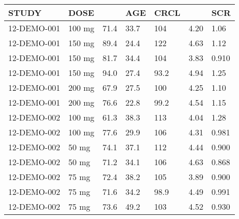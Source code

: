 {\def\arraystretch{1.4}\tabcolsep=5pt
\begin{threeparttable}
\begin{tabular}[h]{lllllll}
\hline
STUDY & DOSE &  & AGE & CRCL &  & SCR \\
\hline
12-DEMO-001 & 100 mg & 71.4 & 33.7 & 104 & 4.20 & 1.06 \\
12-DEMO-001 & 150 mg & 89.4 & 24.4 & 122 & 4.63 & 1.12 \\
12-DEMO-001 & 150 mg & 81.7 & 34.4 & 104 & 3.83 & 0.910 \\
12-DEMO-001 & 150 mg & 94.0 & 27.4 & 93.2 & 4.94 & 1.25 \\
12-DEMO-001 & 200 mg & 67.9 & 27.5 & 100 & 4.25 & 1.10 \\
12-DEMO-001 & 200 mg & 76.6 & 22.8 & 99.2 & 4.54 & 1.15 \\
12-DEMO-002 & 100 mg & 61.3 & 38.3 & 113 & 4.04 & 1.28 \\
12-DEMO-002 & 100 mg & 77.6 & 29.9 & 106 & 4.31 & 0.981 \\
12-DEMO-002 & 50 mg & 74.1 & 37.1 & 112 & 4.44 & 0.900 \\
12-DEMO-002 & 50 mg & 71.2 & 34.1 & 106 & 4.63 & 0.868 \\
12-DEMO-002 & 75 mg & 72.4 & 38.2 & 105 & 3.89 & 0.900 \\
12-DEMO-002 & 75 mg & 71.6 & 34.2 & 98.9 & 4.49 & 0.991 \\
12-DEMO-002 & 75 mg & 73.6 & 49.2 & 103 & 4.52 & 0.930 \\
\hline
\end{tabular}
\end{threeparttable}
}

